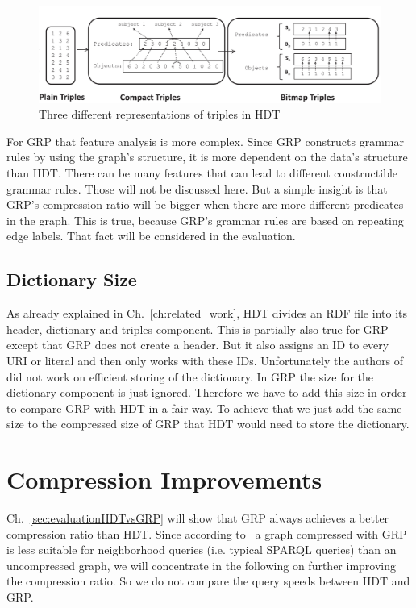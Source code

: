 \begin{figure}[h]
	\centering
	\includegraphics[width=1\textwidth]{figures/relatedwork/hdt1}
	\caption{Three different representations of triples in HDT}
	\label{fig:hdt_overview_1}
\end{figure}

For GRP that feature analysis is more complex. Since GRP constructs grammar rules by using the graph's structure, it is more dependent on the data's structure than HDT. There can be many features that can lead to different constructible grammar rules. Those will not be discussed here. But a simple insight is that GRP's compression ratio will be bigger when there are more different predicates in the graph. This is true, because GRP's grammar rules are based on repeating edge labels. That fact will be considered in the evaluation.

\subsection{Dictionary Size}

As already explained in Ch.~\ref{ch:related_work}, HDT divides an RDF file into its header, dictionary and triples component. This is partially also true for GRP except that GRP does not create a header. But it also assigns an ID to every URI or literal and then only works with these IDs. Unfortunately the authors of~\cite{maneth} did not work on efficient storing of the dictionary. In GRP the size for the dictionary component is just ignored. Therefore we have to add this size in order to compare GRP with HDT in a fair way. To achieve that we just add the same size to the compressed size of GRP that HDT would need to store the dictionary.


\section{Compression Improvements}\label{sec:approachComprRatioImprovements}

Ch.~\ref{sec:evaluationHDTvsGRP} will show that GRP always achieves a better compression ratio than HDT. Since according to~\cite{maneth} a graph compressed with GRP is less suitable for neighborhood queries (i.e. typical SPARQL queries) than an uncompressed graph, we will concentrate in the following on further improving the compression ratio. So we do not compare the query speeds between HDT and GRP.



